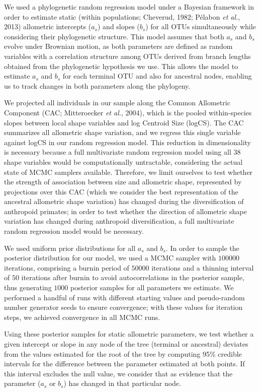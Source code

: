 \documentclass[12pt,]{article}
\begin{document}
We used a phylogenetic random regression model under a Bayesian
framework in order to estimate static (within populations; Cheverud,
1982; Pélabon \emph{et al.}, 2013) allometric intercepts ($a_s$) and
slopes ($b_s$) for all OTUs simultaneously while considering their
phylogenetic structure. This model assumes that both $a_s$ and $b_s$
evolve under Brownian motion, as both parameters are defined as random
variables with a correlation structure among OTUs derived from branch
lengths obtained from the phylogenetic hypothesis we use. This allows
the model to estimate $a_s$ and $b_s$ for each terminal OTU and also for
ancestral nodes, enabling us to track changes in both parameters along
the phylogeny.

We projected all individuals in our sample along the Common Allometric
Component (CAC; Mitteroecker \emph{et al.}, 2004), which is the pooled
within-species slopes between local shape variables and log Centroid
Size (logCS). The CAC summarizes all allometric shape variation, and we
regress this single variable against logCS in our random regression
model. This reduction in dimensionality is necessary because a full
multivariate random regression model using all 38 shape variables would
be computationally untractable, considering the actual state of MCMC
samplers available. Therefore, we limit ourselves to test whether the
strength of association between size and allometric shape, represented
by projections over this CAC (which we consider the best representation
of the ancestral allometric shape variation) has changed during the
diversification of anthropoid primates; in order to test whether the
direction of allometric shape variation has changed during anthropoid
diversification, a full multivariate random regression model would be
necessary.

We used uniform prior distributions for all $a_s$ and $b_s$. In order to
sample the posterior distribution for our model, we used a MCMC sampler
with $100000$ iterations, comprising a burnin period of $50000$
iterations and a thinning interval of $50$ iterations after burnin to
avoid autocorrelations in the posterior sample, thus generating $1000$
posterior samples for all parameters we estimate. We performed a handful
of runs with different starting values and pseudo-random number
generator seeds to ensure convergence; with these values for iteration
steps, we achieved convergence in all MCMC runs.

Using these posterior samples for static allometric parameters, we test
whether a given intercept or slope in any node of the tree (terminal or
ancestral) deviates from the values estimated for the root of the tree
by computing 95\% credible intervals for the difference between the
parameter estimated at both points. If this interval excludes the null
value, we consider that as evidence that the parameter ($a_s$ or $b_s$)
has changed in that particular node.
\end{document}
